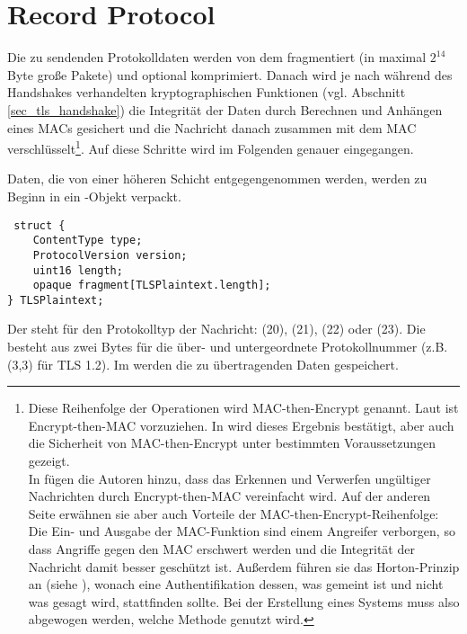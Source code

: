 \section{Record Protocol}
Die zu sendenden Protokolldaten werden von dem \recordprotocol{} fragmentiert (in maximal \(2^{14}\) Byte große Pakete) und optional komprimiert. Danach wird je nach während des Handshakes verhandelten kryptographischen Funktionen (vgl. Abschnitt \ref{sec_tls_handshake}) die Integrität der Daten durch Berechnen und Anhängen eines MACs gesichert und die Nachricht danach zusammen mit dem MAC verschlüsselt\footnote{
Diese Reihenfolge der Operationen wird MAC-then-Encrypt genannt.
Laut \cite{AE2000} ist Encrypt-then-MAC vorzuziehen.
In \cite{krawczyk01} wird dieses Ergebnis bestätigt, aber auch die Sicherheit von MAC-then-Encrypt unter bestimmten Voraussetzungen gezeigt.\\
In \cite{ferguson10} fügen die Autoren hinzu, dass das Erkennen und Verwerfen ungültiger Nachrichten durch Encrypt-then-MAC vereinfacht wird. Auf der anderen Seite erwähnen sie aber auch Vorteile der MAC-then-Encrypt-Reihenfolge: Die Ein- und Ausgabe der MAC-Funktion sind einem Angreifer verborgen, so dass Angriffe gegen den MAC erschwert werden und die Integrität der Nachricht damit besser geschützt ist. Außerdem führen sie das Horton-Prinzip an (siehe \cite{wagner96}), wonach eine Authentifikation dessen, was gemeint ist und nicht was gesagt wird, stattfinden sollte. Bei der Erstellung eines Systems muss also abgewogen werden, welche Methode genutzt wird.
}. Auf diese Schritte wird im Folgenden genauer eingegangen.

Daten, die von einer höheren Schicht entgegengenommen werden, werden zu Beginn in ein -Objekt verpackt. 

\begin{lstlisting}
 struct {
	ContentType type;  
	ProtocolVersion version; 
	uint16 length;
	opaque fragment[TLSPlaintext.length];
} TLSPlaintext;
\end{lstlisting}

%

Der  steht für den Protokolltyp der Nachricht: \changecipherspecprotocol{} (20), \alertprotocol{} (21), \handshakeprotocol{} (22) oder \applicationdataprotocol{} (23). Die  besteht aus zwei Bytes für die über- und untergeordnete Protokollnummer (z.B. (3,3) für TLS 1.2). Im  werden die zu übertragenden Daten gespeichert.

